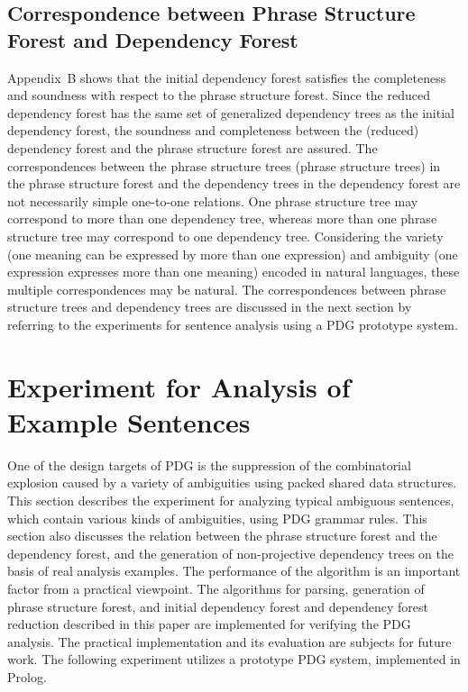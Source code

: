 \documentclass[english]{jnlp_1.4_rep}
\theoremstyle{break}
\theoremstyle{plain}
\theoremstyle{plain}
\begin{document}
\subsection{Correspondence between Phrase Structure Forest and Dependency Forest}
\label{sec:MappingBetweenPTAndDT}

Appendix~B shows that the initial dependency forest satisfies the
completeness and soundness with respect to the phrase structure
forest. Since the reduced dependency forest has the same set of
generalized dependency trees as the initial dependency forest, the
soundness and completeness between the (reduced) dependency forest and
the phrase structure forest are assured. The correspondences between
the phrase structure trees (phrase structure trees) in the phrase
structure forest and the dependency trees in the dependency forest are
not necessarily simple one-to-one relations. One phrase structure tree
may correspond to more than one dependency tree, whereas more than one
phrase structure tree may correspond to one dependency
tree. Considering the variety (one meaning can be expressed by more
than one expression) and ambiguity (one expression expresses more than
one meaning) encoded in natural languages, these
multiple correspondences may be natural. The correspondences between
phrase structure trees and dependency trees are discussed in the next
section by referring to the experiments for sentence analysis using a
PDG prototype system.


\section{Experiment for Analysis of Example Sentences}

One of the design targets of PDG is the suppression of the
combinatorial explosion caused by a variety of ambiguities using
packed shared data structures. This section describes the experiment
for analyzing typical ambiguous sentences, which contain various kinds
of ambiguities, using PDG grammar rules. This section also discusses
the relation between the phrase structure forest and the dependency
forest, and the generation of non-projective dependency trees on the
basis of real analysis examples. The performance of the algorithm is
an important factor from a practical viewpoint. The algorithms for
parsing, generation of phrase structure forest, and initial dependency
forest and dependency forest reduction described in this paper are
implemented for verifying the PDG analysis. The practical
implementation and its evaluation are subjects for future work. The
following experiment utilizes a prototype PDG system, implemented in
Prolog.
\end{document}

